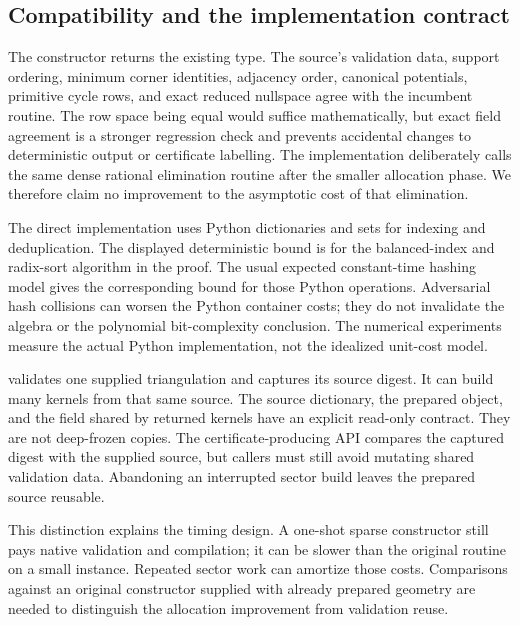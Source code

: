 \subsection{Compatibility and the implementation contract}

The constructor returns the existing  type.
The source's validation data, support ordering, minimum corner
identities, adjacency order, canonical potentials, primitive cycle
rows, and exact reduced nullspace agree with the incumbent routine.
The row space being equal would suffice mathematically, but exact
field agreement is a stronger regression check and prevents
accidental changes to deterministic output or certificate labelling.
The implementation deliberately calls the same dense rational
elimination routine after the smaller allocation phase.  We therefore
claim no improvement to the asymptotic cost of that elimination.

The direct implementation uses Python dictionaries and sets for
indexing and deduplication.  The displayed deterministic bound is for
the balanced-index and radix-sort algorithm in the proof.  The usual
expected constant-time hashing model gives the corresponding bound
for those Python operations.  Adversarial hash collisions can worsen
the Python container costs; they do not invalidate the algebra or
the polynomial bit-complexity conclusion.  The numerical experiments
measure the actual Python implementation, not the idealized unit-cost
model.

 validates one supplied triangulation and
captures its source digest.  It can build many kernels from that same
source.  The source dictionary, the prepared object, and the
 field shared by returned kernels have an explicit
read-only contract.  They are not deep-frozen copies.  The
certificate-producing API compares the captured digest with the
supplied source, but callers must still avoid mutating shared
validation data.  Abandoning an interrupted sector build leaves the
prepared source reusable.

This distinction explains the timing design.  A one-shot sparse
constructor still pays native validation and compilation; it can be
slower than the original routine on a small instance.  Repeated sector
work can amortize those costs.  Comparisons against an original
constructor supplied with already prepared geometry are needed to
distinguish the allocation improvement from validation reuse.
